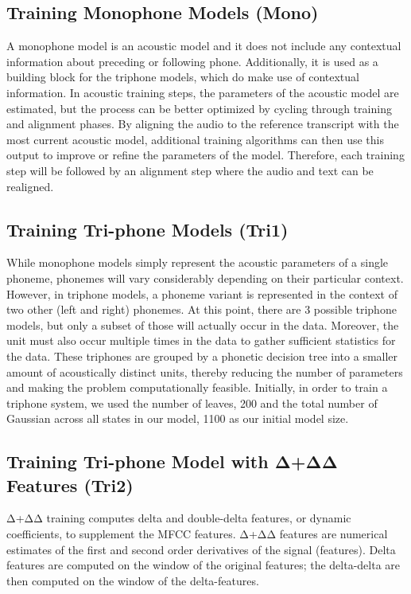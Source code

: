 \documentclass[conference]{IEEEtran}
\begin{document}
\subsection{Training Monophone Models (Mono)}
\label{sec:TrainingMonophoneModels}
A monophone model is an acoustic model and it does not include any contextual information about preceding or following phone. Additionally, it is used as a building block for the triphone models, which do make use of contextual information. In acoustic training steps, the parameters of the acoustic model are estimated, but the process can be better optimized by cycling through training and alignment phases. By aligning the audio to the reference transcript with the most current acoustic model, additional training algorithms can then use this output to improve or refine the parameters of the model. Therefore, each training step will be followed by an alignment step where the audio and text can be realigned.

\subsection{Training Tri-phone Models (Tri1)}
\label{sec:TrainingTri-phoneModels}
While monophone models simply represent the acoustic parameters of a single phoneme, phonemes will vary considerably depending on their particular context. However, in triphone models, a phoneme variant is represented in the context of two other (left and right) phonemes. At this point, there are 3 possible triphone models, but only a subset of those will actually occur in the data. Moreover, the unit must also occur multiple times in the data to gather sufficient statistics for the data. These triphones are grouped by a phonetic decision tree into a smaller amount of acoustically distinct units, thereby reducing the number of parameters and making the problem computationally feasible. Initially, in order to train a triphone system, we used the number of leaves, 200 and the total number of Gaussian across all states in our model, 1100 as our initial model size.

\subsection{Training Tri-phone Model with Δ+ΔΔ Features (Tri2)}
\label{sec:TrainingTri-phoneModelwithDelta}
Δ+ΔΔ training computes delta and double-delta features, or dynamic coefficients, to supplement the MFCC features. Δ+ΔΔ features are numerical estimates of the first and second order derivatives of the signal (features). Delta features are computed on the window of the original features; the delta-delta are then computed on the window of the delta-features.
\end{document}
